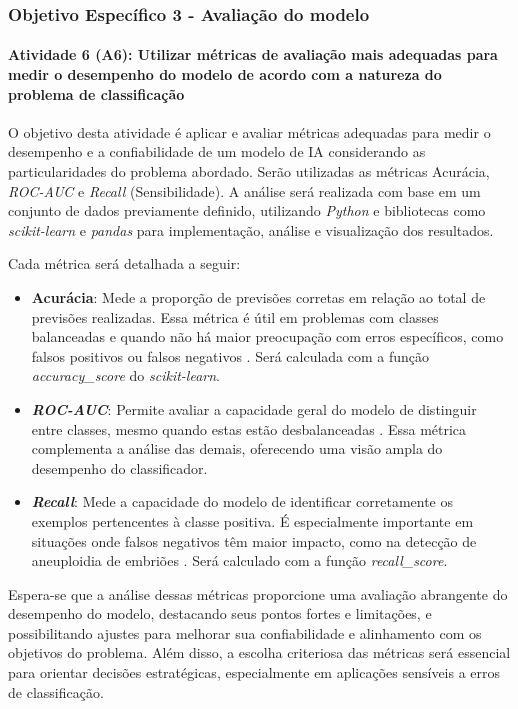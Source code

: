 \subsubsection{\textbf{Objetivo Específico 3} - Avaliação do modelo}

\paragraph{\textbf{Atividade 6 (A6):} Utilizar métricas de avaliação mais adequadas para medir o desempenho do modelo de acordo com a natureza do problema de classificação}

O objetivo desta atividade é aplicar e avaliar métricas adequadas para medir o desempenho e a confiabilidade de um modelo de IA considerando as particularidades do problema abordado. Serão utilizadas as métricas Acurácia, \textit{ROC-AUC} e \textit{Recall} (Sensibilidade). A análise será realizada com base em um conjunto de dados previamente definido, utilizando \textit{Python} e bibliotecas como \textit{scikit-learn} e \textit{pandas} para implementação, análise e visualização dos resultados.

Cada métrica será detalhada a seguir:

\begin{itemize}
    \item \textbf{Acurácia}: Mede a proporção de previsões corretas em relação ao total de previsões realizadas. Essa métrica é útil em problemas com classes balanceadas e quando não há maior preocupação com erros específicos, como falsos positivos ou falsos negativos \cite{vilela2022}. Será calculada com a função \textit{accuracy\_score} do \textit{scikit-learn}.

    \item \textbf{\textit{ROC-AUC}}: Permite avaliar a capacidade geral do modelo de distinguir entre classes, mesmo quando estas estão desbalanceadas \cite{vilela2022}. Essa métrica complementa a análise das demais, oferecendo uma visão ampla do desempenho do classificador.

    \item \textbf{\textit{Recall}}: Mede a capacidade do modelo de identificar corretamente os exemplos pertencentes à classe positiva. É especialmente importante em situações onde falsos negativos têm maior impacto, como na detecção de aneuploidia de embriões \cite{vilela2022}. Será calculado com a função \textit{recall\_score}.
\end{itemize}

Espera-se que a análise dessas métricas proporcione uma avaliação abrangente do desempenho do modelo, destacando seus pontos fortes e limitações, e possibilitando ajustes para melhorar sua confiabilidade e alinhamento com os objetivos do problema. Além disso, a escolha criteriosa das métricas será essencial para orientar decisões estratégicas, especialmente em aplicações sensíveis a erros de classificação.

